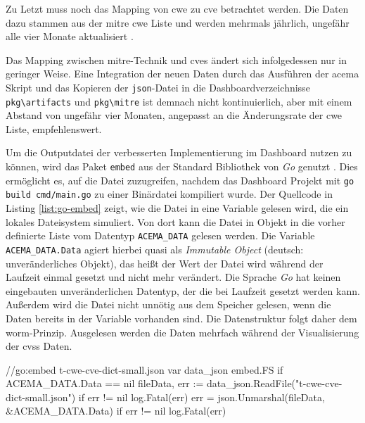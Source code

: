 Zu Letzt muss noch das Mapping von \gls{cwe} zu \gls{cve} betrachtet werden. Die Daten dazu stammen aus der \gls{mitre} \gls{cwe} Liste und werden mehrmals jährlich, ungefähr alle vier Monate aktualisiert \autocite{CWEDownloads,AIWorkingGroupMeeting_slides20241115_CWEAIWGpdf2024}.

Das Mapping zwischen \gls{mitre}-Technik und \glspl{cve} ändert sich infolgedessen nur in geringer Weise. Eine Integration der neuen Daten durch das Ausführen der \gls{acema} Skript und das Kopieren der \verb|json|-Datei in die Dashboardverzeichnisse \verb|pkg\artifacts| und \verb|pkg\mitre| ist demnach nicht kontinuierlich, aber mit einem Abstand von ungefähr vier Monaten, angepasst an die Änderungsrate der \gls{cwe} Liste, empfehlenswert.

Um die Outputdatei der verbesserten Implementierung im Dashboard nutzen zu können, wird das Paket \verb|embed| aus der Standard Bibliothek von \textit{Go} genutzt \autocite{EmbedPackageEmbed}. Dies ermöglicht es, auf die Datei zuzugreifen, nachdem das Dashboard Projekt mit \verb|go build cmd/main.go| zu einer Binärdatei kompiliert wurde. Der Quellcode in Listing \ref{list:go-embed} zeigt, wie die Datei in eine Variable gelesen wird, die ein lokales Dateisystem simuliert. Von dort kann die Datei in Objekt in die vorher definierte Liste vom Datentyp \verb|ACEMA_DATA| gelesen werden. Die Variable \verb|ACEMA_DATA.Data| agiert hierbei quasi als \textit{Immutable Object} (deutsch: unveränderliches Objekt), das heißt der Wert der Datei wird während der Laufzeit einmal gesetzt und nicht mehr verändert. Die Sprache \textit{Go} hat keinen eingebauten unveränderlichen Datentyp, der die bei Laufzeit gesetzt werden kann. Außerdem wird die Datei nicht unnötig aus dem Speicher gelesen, wenn die Daten bereits in der Variable vorhanden sind. Die Datenstruktur folgt daher dem \gls{worm}-Prinzip. Ausgelesen werden die Daten mehrfach während der Visualisierung der \gls{cvss} Daten.

\begin{code}[caption=Datei in Binardatei einbetten und in Struktur überführen]
    //go:embed t-cwe-cve-dict-small.json
    var data_json embed.FS
    if ACEMA_DATA.Data == nil {
        fileData, err := data_json.ReadFile("t-cwe-cve-dict-small.json")
        if err != nil {
            log.Fatal(err)
        }
        err = json.Unmarshal(fileData, &ACEMA_DATA.Data)
        if err != nil {
            log.Fatal(err)
        }
    }
\end{code}
\label{list:go-embed}

